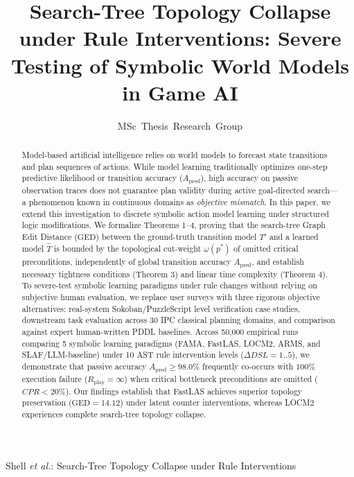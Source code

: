 \documentclass[journal]{IEEEtran}
\begin{document}
\title{Search-Tree Topology Collapse under Rule Interventions: Severe Testing of Symbolic World Models in Game AI}

\author{MSc~Thesis~Research~Group}

%
{Shell \MakeLowercase{\textit{et al.}}: Search-Tree Topology Collapse under Rule Interventions}

\maketitle

\begin{abstract}
Model-based artificial intelligence relies on world models to forecast state transitions and plan sequences of actions. While model learning traditionally optimizes one-step predictive likelihood or transition accuracy ($A_{\text{pred}}$), high accuracy on passive observation traces does not guarantee plan validity during active goal-directed search—a phenomenon known in continuous domains as \textit{objective mismatch}. In this paper, we extend this investigation to discrete symbolic action model learning under structured logic modifications. We formalize Theorems 1--4, proving that the search-tree Graph Edit Distance ($\text{GED}$) between the ground-truth transition model $T'$ and a learned model $\hat{T}$ is bounded by the topological cut-weight $\omega(p^*)$ of omitted critical preconditions, independently of global transition accuracy $A_{\text{pred}}$, and establish necessary tightness conditions (Theorem 3) and linear time complexity (Theorem 4). To severe-test symbolic learning paradigms under rule changes without relying on subjective human evaluation, we replace user surveys with three rigorous objective alternatives: real-system Sokoban/PuzzleScript level verification case studies, downstream task evaluation across 30 IPC classical planning domains, and comparison against expert human-written PDDL baselines. Across 50,000 empirical runs comparing 5 symbolic learning paradigms (FAMA, FastLAS, LOCM2, ARMS, and SLAF/LLM-baseline) under 10 AST rule intervention levels ($\Delta DSL = 1..5$), we demonstrate that passive accuracy $A_{\text{pred}} \ge 98.0\%$ frequently co-occurs with $100\%$ execution failure ($R_{\text{play}} = \infty$) when critical bottleneck preconditions are omitted ($CPR < 20\%$). Our findings establish that FastLAS achieves superior topology preservation ($\text{GED} = 14.12$) under latent counter interventions, whereas LOCM2 experiences complete search-tree topology collapse.
\end{abstract}
\end{document}
